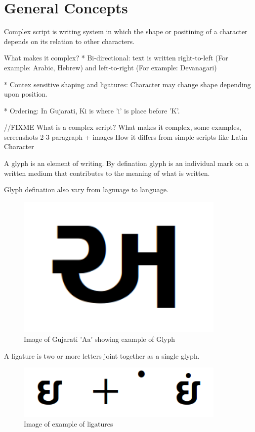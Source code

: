 \chapter{General Concepts}


Complex script is writing system in which the shape or positining of a character
depends on its relation to other characters.

What makes it complex?
* Bi-directional: text is written right-to-left (For example: Arabic, Hebrew)
and left-to-right (For example: Devanagari)

* Contex sensitive shaping and ligatures: Character may change shape depending
upon position.

* Ordering:
In Gujarati, Ki is where 'i' is place before 'K'.

//FIXME
What is a complex script? What makes it complex, some examples, screenshots
2-3 paragraph + images
How it differs from simple scripts like Latin Character

A glyph is an element of writing. By defination glyph is an individual mark on
a written medium that contributes to the meaning of what is written.

Glyph defination also vary from lagnuage to language.

\begin{figure}[hb]
\centering
\includegraphics[width=4in]{Images/glyph.png}
\caption[Glyph example]
{Image of Gujarati 'Aa' showing example of Glyph}
 \end{figure}


A ligature is two or more letters joint together as a single glyph.

\begin{figure}[hb]
\centering
\includegraphics[width=4in]{Images/ligature.png}
\caption[Ligature example]
{Image of example of ligatures}
 \end{figure}

